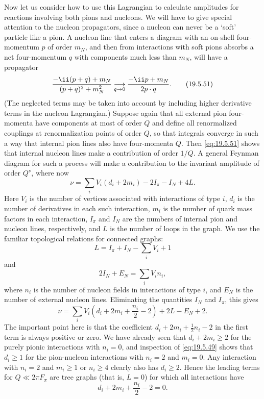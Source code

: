 Now let us consider how to use this Lagrangian to calculate amplitudes for reactions involving both pions and nucleons. We will have to give special attention to the nucleon propagators, since a nucleon can never be a `soft' particle like a pion. A nucleon line that enters a diagram with an on-shell four-momentum $p$ of order $m_N$, and then from interactions with soft pions absorbs a net four-momentum $q$ with components much less than $m_N$, will have a propagator
\begin{equation}
\frac{-\ii(\sl{p}+\sl{q})+m_N}{(p+q)^2+m_N^2}
\underset{q\to0}{\longrightarrow}
\frac{-\ii\sl{p}+m_N}{2p\cdot q}.
\tag{19.5.51}\label{eq:19.5.51}
\end{equation}
(The neglected terms may be taken into account by including higher derivative terms in the nucleon Lagrangian.) Suppose again that all external pion four-momenta have components at most of order $Q$ and define all renormalized couplings at renormalization points of order $Q$, so that integrals converge in such a way that internal pion lines also have four-momenta $Q$. Then \eqref{eq:19.5.51} shows that internal nucleon lines make a contribution of order $1/Q$. A general Feynman diagram for such a process will make a contribution to the invariant amplitude of order $Q^\nu$, where now
\begin{equation}
\nu=\sum_iV_i(d_i+2m_i)-2I_\pi-I_N+4L.
\tag{19.5.52}\label{eq:19.5.52}
\end{equation}
Here $V_i$ is the number of vertices associated with interactions of type $i$, $d_i$ is the number of derivatives in each such interaction, $m_i$ is the number of quark mass factors in each interaction, $I_\pi$ and $I_N$ are the numbers of internal pion and nucleon lines, respectively, and $L$ is the number of loops in the graph. We use the familiar topological relations for connected graphs:
\begin{equation}
L=I_\pi+I_N-\sum_iV_i+1
\tag{19.5.53}\label{eq:19.5.53}
\end{equation}
and
\begin{equation}
2I_N+E_N=\sum_iV_i n_i,
\tag{19.5.54}\label{eq:19.5.54}
\end{equation}
where $n_i$ is the number of nucleon fields in interactions of type $i$, and $E_N$ is the number of external nucleon lines. Eliminating the quantities $I_N$ and $I_\pi$, this gives
\begin{equation}
\nu=\sum_iV_i\left(d_i+2m_i+\frac{n_i}{2}-2\right)
+2L-E_N+2.
\tag{19.5.55}\label{eq:19.5.55}
\end{equation}
The important point here is that the coefficient $d_i+2m_i+\tfrac12n_i-2$ in the first term is always positive or zero. We have already seen that $d_i+2m_i\geq2$ for the purely pionic interactions with $n_i=0$, and inspection of \eqref{eq:19.5.49} shows that $d_i\geq1$ for the pion-nucleon interactions with $n_i=2$ and $m_i=0$. Any interaction with $n_i=2$ and $m_i\geq1$ or $n_i\geq4$ clearly also has $d_i\geq2$. Hence the leading terms for $Q\ll2\pi F_\pi$ are tree graphs (that is, $L=0$) for which all interactions have
\[
d_i+2m_i+\frac{n_i}{2}-2=0.
\]

